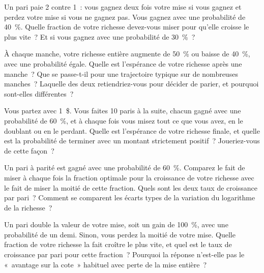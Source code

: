 \begin{question}\label{iq:iv2:betting-and-kelly:4}
Un pari paie 2 contre 1~: vous gagnez deux fois votre mise si vous gagnez et perdez votre mise si vous ne gagnez pas. Vous gagnez avec une probabilité de 40~\%. Quelle fraction de votre richesse devez-vous miser pour qu'elle croisse le plus vite~? Et si vous gagnez avec une probabilité de 30~\%~?
\end{question}

\begin{question}\label{iq:iv2:betting-and-kelly:5}
À chaque manche, votre richesse entière augmente de 50~\% ou baisse de 40~\%, avec une probabilité égale. Quelle est l'espérance de votre richesse après une manche~? Que se passe-t-il pour une trajectoire typique sur de nombreuses manches~? Laquelle des deux retiendriez-vous pour décider de parier, et pourquoi sont-elles différentes~?
\end{question}

\begin{question}\label{iq:iv2:betting-and-kelly:6}
Vous partez avec 1~\$. Vous faites 10 paris à la suite, chacun gagné avec une probabilité de 60~\%, et à chaque fois vous misez tout ce que vous avez, en le doublant ou en le perdant. Quelle est l'espérance de votre richesse finale, et quelle est la probabilité de terminer avec un montant strictement positif~? Joueriez-vous de cette façon~?
\end{question}

\begin{question}\label{iq:iv2:betting-and-kelly:7}
Un pari à parité est gagné avec une probabilité de 60~\%. Comparez le fait de miser à chaque fois la fraction optimale pour la croissance de votre richesse avec le fait de miser la moitié de cette fraction. Quels sont les deux taux de croissance par pari~? Comment se comparent les écarts types de la variation du logarithme de la richesse~?
\end{question}

\begin{question}\label{iq:iv2:betting-and-kelly:8}
Un pari double la valeur de votre mise, soit un gain de 100~\%, avec une probabilité de un demi. Sinon, vous perdez la moitié de votre mise. Quelle fraction de votre richesse la fait croître le plus vite, et quel est le taux de croissance par pari pour cette fraction~? Pourquoi la réponse n'est-elle pas le «~avantage sur la cote~» habituel avec perte de la mise entière~?
\end{question}


